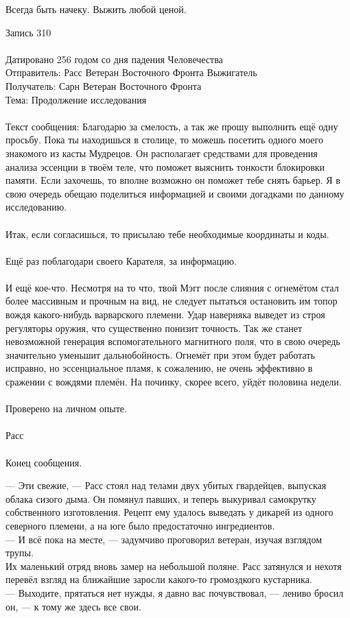 Всегда быть начеку. Выжить любой ценой.

\newpage

\begin{mssg}{%
Запись 310\\
\\
Датировано 256 годом со дня падения Человечества\\
Отправитель: Расс Ветеран Восточного Фронта Выжигатель\\
Получатель: Сарн Ветеран Восточного Фронта\\
Тема: Продолжение исследования\\
\\
Текст сообщения:
}%
Благодарю за смелость, а так же прошу выполнить ещё одну просьбу. Пока ты 
находишься в столице, то можешь посетить одного моего знакомого из касты 
Мудрецов. Он располагает средствами для проведения анализа эссенции в твоём 
теле, что поможет выяснить тонкости блокировки памяти. Если захочешь, то вполне 
возможно он поможет тебе снять барьер. Я в свою очередь обещаю поделиться 
информацией и своими догадками по данному исследованию.\\
\\
Итак, если согласишься, то присылаю тебе необходимые координаты и коды.\\ 
\\
Ещё раз поблагодари своего Карателя, за информацию.\\
\\
И ещё кое-что. Несмотря на то что, твой Мэгг после слияния с огнемётом стал 
более массивным и прочным на вид, не следует пытаться остановить им топор вождя 
какого-нибудь варварского племени. Удар наверняка выведет из строя регуляторы 
оружия, что существенно понизит точность. Так же станет невозможной генерация 
вспомогательного магнитного поля, что в свою очередь значительно уменьшит 
дальнобойность. Огнемёт при этом будет работать исправно, но эссенциальное 
пламя, к сожалению, не очень эффективно в сражении с вождями племён. На починку, 
скорее всего, уйдёт половина недели.\\
\\
Проверено на личном опыте.\\
\\
Расс\\
\\
Конец сообщения. 
\end{mssg}

\noindent --- Эти свежие, --- Расс стоял над телами двух убитых гвардейцев, 
выпуская облака сизого дыма. Он помянул павших, и теперь выкуривал самокрутку 
собственного изготовления. Рецепт ему удалось выведать у дикарей из одного 
северного племени, а на юге было предостаточно ингредиентов.\\
--- И всё пока на месте, --- задумчиво проговорил ветеран, изучая взглядом 
трупы. \\
Их маленький отряд вновь замер на небольшой поляне. Расс затянулся и нехотя 
перевёл взгляд на ближайшие заросли какого-то громоздкого кустарника.\\
--- Выходите, прятаться нет нужды, я давно вас почувствовал, --- лениво бросил 
он, --- к тому же здесь все свои.


